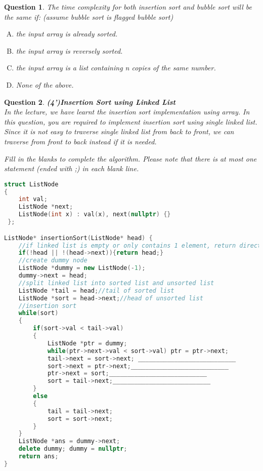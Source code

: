 \documentclass{article}
\newtheorem{Q}{Question}
\begin{document}
\begin{Q}
	The time complexity for both insertion sort and bubble sort will be the same if: (assume bubble sort is flagged bubble sort)
	\begin{enumerate}[(A)]
		\item the input array is already sorted.
		\item the input array is reversely sorted.
		\item the input array is a list containing n copies of the same number.
		\item None of the above.
	\end{enumerate}
\end{Q}
\vspace{6cm}
\begin{Q}\textbf{(4')Insertion Sort using Linked List}\\
	In the lecture, we have learnt the insertion sort implementation using array. In this question, you are required to implement insertion sort using single linked list. Since it is not easy to traverse single linked list from back to front, we can traverse from front to back instead if it is needed.

	Fill in the blanks to complete the algorithm. Please note that there is at most one statement (ended with ;) in each blank line.

	\hrulefill
	\rm{
		\begin{lstlisting}[language=C++]
struct ListNode 
{
    int val;
 	ListNode *next;
 	ListNode(int x) : val(x), next(nullptr) {}
 };

ListNode* insertionSort(ListNode* head) {
    //if linked list is empty or only contains 1 element, return directly
    if(!head || !(head->next)){return head;}
    //create dummy node
    ListNode *dummy = new ListNode(-1);
    dummy->next = head;
    //split linked list into sorted list and unsorted list
    ListNode *tail = head;//tail of sorted list
    ListNode *sort = head->next;//head of unsorted list
    //insertion sort
    while(sort)
    {
        if(sort->val < tail->val)
        {
            ListNode *ptr = dummy;
            while(ptr->next->val < sort->val) ptr = ptr->next;
            tail->next = sort->next; ___________________________
            sort->next = ptr->next;___________________________
            ptr->next = sort;___________________________
            sort = tail->next;___________________________
        }
        else
        {	
            tail = tail->next;
            sort = sort->next;
        }
    }
    ListNode *ans = dummy->next;
    delete dummy; dummy = nullptr;
    return ans;
}
\end{lstlisting}
	}
	\vspace{1cm}
\end{Q}
\end{document}
